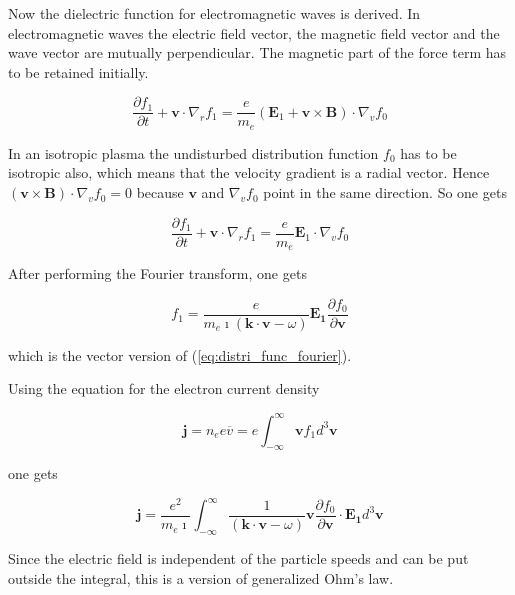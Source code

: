 \documentclass[a4paper,11pt]{thesis}
\begin{document}
Now the dielectric function for electromagnetic waves is derived. In electromagnetic waves the electric field vector, the magnetic field vector and the wave vector are mutually perpendicular. The magnetic part of the force term has to be retained initially.

\begin{equation}\label{eq:vlasov_full_linearized}
\frac{\partial f_1}{\partial t} + \mathbf{v}\cdot
\nabla_r f_1=\frac{e}{m_e}\left( \mathbf{E}_1+\mathbf{v} \times \mathbf{B}\right) \cdot \nabla_v f_0
\end{equation}

In an isotropic plasma the undisturbed distribution function $f_0$ has to be isotropic also, which means that the velocity gradient is a radial vector. Hence $\left( \mathbf{v} \times \mathbf{B}\right) \cdot\nabla_v f_0=0$ because $\mathbf{v}$ and $\nabla_v f_0$ point in the same direction. So one gets

\begin{equation}\label{eq:vlasov_linearized2}
\frac{\partial f_1}{\partial t} + \mathbf{v}\cdot
\nabla_r f_1=\frac{e}{m_e} \mathbf{E}_1 \cdot \nabla_v f_0
\end{equation}

After performing the Fourier transform, one gets

\begin{equation}\label{eq:distri_func_fourier3d}
f_1=\frac{e}{m_e \imath (\textbf{k} \cdot \mathbf{v}-\omega)}\mathbf{E_1} \frac{\partial f_0}{\partial \mathbf{v}}
\end{equation}

which is the vector version of (\ref{eq:distri_func_fourier}).

Using the equation for the electron current density

\begin{equation}
\mathbf{j} =  n_e e \overline{v}= e\int_{-\infty}^{\infty} \mathbf{v} f_1 d^3 \mathbf{v}
\end{equation}

 one gets

 \begin{equation}
\mathbf{j} =   \frac{e^2}{m_e \imath} \int_{-\infty}^{\infty} \frac{1}{ (\textbf{k} \cdot \mathbf{v}-\omega)} \mathbf{v} \frac{\partial f_0}{\partial \mathbf{v}} \cdot \mathbf{E_1} d^3 \mathbf{v}
\end{equation}


Since the electric field is independent of the particle speeds and can be put outside the integral, this is a version of generalized Ohm's law.
\end{document}
